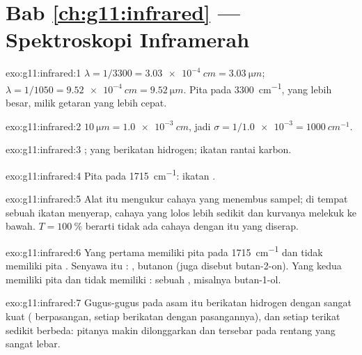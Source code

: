 \section*{Bab \ref{ch:g11:infrared} --- Spektroskopi Inframerah}

\begin{solution}{exo:g11:infrared:1}
$\lambda = 1/3300 = \qty{3.03e-4}{cm} = \qty{3.03}{\micro m}$;
$\lambda = 1/1050 = \qty{9.52e-4}{cm} = \qty{9.52}{\micro m}$. Pita pada
\qty{3300}{cm^{-1}}, yang  lebih besar, milik
getaran yang lebih cepat.
\end{solution}

\begin{solution}{exo:g11:infrared:2}
$\qty{10}{\micro m} = \qty{1.0e-3}{cm}$, jadi $\sigma = 1/\num{1.0e-3} =
\qty{1000}{cm^{-1}}$.
\end{solution}

\begin{solution}{exo:g11:infrared:3}
 ;   yang berikatan hidrogen; ikatan
 rantai karbon.
\end{solution}

\begin{solution}{exo:g11:infrared:4}
Pita pada \qty{1715}{cm^{-1}}: ikatan .
\end{solution}

\begin{solution}{exo:g11:infrared:5}
Alat itu mengukur cahaya yang menembus sampel; di tempat sebuah ikatan
menyerap, cahaya yang lolos lebih sedikit dan kurvanya melekuk ke bawah.
$T =
\qty{100}{\percent}$ berarti tidak ada cahaya dengan  itu yang diserap.
\end{solution}

\begin{solution}{exo:g11:infrared:6}
Yang pertama memiliki pita  pada \qty{1715}{cm^{-1}} dan tidak
memiliki pita . Senyawa itu : , butanon
(juga disebut butan-2-on). Yang kedua memiliki pita  dan tidak
memiliki : sebuah , misalnya butan-1-ol.
\end{solution}

\begin{solution}{exo:g11:infrared:7}
Gugus-gugus  pada asam itu berikatan hidrogen dengan sangat kuat
( berpasangan, setiap  berikatan dengan
  pasangannya), dan setiap  terikat sedikit
berbeda: pitanya makin dilonggarkan dan tersebar pada rentang yang
sangat lebar.
\end{solution}

